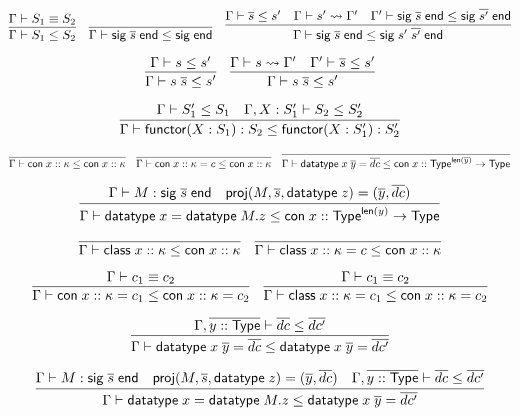 \documentclass{article}
\newcommand{\mt}[1]{\mathsf{#1}}
\begin{document}
$$\infer{\Gamma \vdash S_1 \leq S_2}{
  \Gamma \vdash S_1 \equiv S_2
}
\quad \infer{\Gamma \vdash \mt{sig} \; \overline{s} \; \mt{end} \leq \mt{sig} \; \mt{end}}{}
\quad \infer{\Gamma \vdash \mt{sig} \; \overline{s} \; \mt{end} \leq \mt{sig} \; s' \; \overline{s'} \; \mt{end}}{
  \Gamma \vdash \overline{s} \leq s'
  & \Gamma \vdash s' \leadsto \Gamma'
  & \Gamma' \vdash \mt{sig} \; \overline{s} \; \mt{end} \leq \mt{sig} \; \overline{s'} \; \mt{end}
}$$

$$\infer{\Gamma \vdash s \; \overline{s} \leq s'}{
  \Gamma \vdash s \leq s'
}
\quad \infer{\Gamma \vdash s \; \overline{s} \leq s'}{
  \Gamma \vdash s \leadsto \Gamma'
  & \Gamma' \vdash \overline{s} \leq s'
}$$

$$\infer{\Gamma \vdash \mt{functor} (X : S_1) : S_2 \leq \mt{functor} (X : S'_1) : S'_2}{
  \Gamma \vdash S'_1 \leq S_1
  & \Gamma, X : S'_1 \vdash S_2 \leq S'_2
}$$

$$\infer{\Gamma \vdash \mt{con} \; x :: \kappa \leq \mt{con} \; x :: \kappa}{}
\quad \infer{\Gamma \vdash \mt{con} \; x :: \kappa = c \leq \mt{con} \; x :: \kappa}{}
\quad \infer{\Gamma \vdash \mt{datatype} \; x \; \overline{y} = \overline{dc} \leq \mt{con} \; x :: \mt{Type}^{\mt{len}(\overline y)} \to \mt{Type}}{}$$

$$\infer{\Gamma \vdash \mt{datatype} \; x = \mt{datatype} \; M.z \leq \mt{con} \; x :: \mt{Type}^{\mt{len}(y)} \to \mt{Type}}{
  \Gamma \vdash M : \mt{sig} \; \overline{s} \; \mt{end}
  & \mt{proj}(M, \overline{s}, \mt{datatype} \; z) = (\overline{y}, \overline{dc})
}$$

$$\infer{\Gamma \vdash \mt{class} \; x :: \kappa \leq \mt{con} \; x :: \kappa}{}
\quad \infer{\Gamma \vdash \mt{class} \; x :: \kappa = c \leq \mt{con} \; x :: \kappa}{}$$

$$\infer{\Gamma \vdash \mt{con} \; x :: \kappa = c_1 \leq \mt{con} \; x :: \mt{\kappa} = c_2}{
  \Gamma \vdash c_1 \equiv c_2
}
\quad \infer{\Gamma \vdash \mt{class} \; x :: \kappa = c_1 \leq \mt{con} \; x :: \kappa = c_2}{
  \Gamma \vdash c_1 \equiv c_2
}$$

$$\infer{\Gamma \vdash \mt{datatype} \; x \; \overline{y} = \overline{dc} \leq \mt{datatype} \; x \; \overline{y} = \overline{dc'}}{
  \Gamma, \overline{y :: \mt{Type}} \vdash \overline{dc} \leq \overline{dc'}
}$$

$$\infer{\Gamma \vdash \mt{datatype} \; x = \mt{datatype} \; M.z \leq \mt{datatype} \; x \; \overline{y} = \overline{dc'}}{
  \Gamma \vdash M : \mt{sig} \; \overline{s} \; \mt{end}
  & \mt{proj}(M, \overline{s}, \mt{datatype} \; z) = (\overline{y}, \overline{dc})
  & \Gamma, \overline{y :: \mt{Type}} \vdash \overline{dc} \leq \overline{dc'}
}$$
\end{document}
